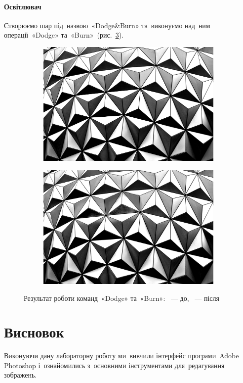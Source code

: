 \documentclass[
	a4paper,
	oneside,
	BCOR = 10mm,
	DIV = 12,
	12pt,
	headings = normal,
]{scrartcl}
\begin{document}
		\paragraph{Освітлювач}
			Створюємо шар під~назвою~\textenglish{«Dodge\&Burn»} та~виконуємо над~ним операції~\textenglish{«Dodge»} та~\textenglish{«Burn»}~(рис.~\ref{fig:07-dodge-burn}).
			\begin{figure}[!htbp]
				\centering
				\begin{subfigure}{0.5\columnwidth}
					\centering
					\includegraphics[height = 6\baselineskip]{./assets/abstract-abstract-photo-art-1070345.jpg}
					\caption{}
					\label{subfig:07-01-dodge-burn}
				\end{subfigure}%
				\begin{subfigure}{0.5\columnwidth}
					\centering
					\includegraphics[height = 6\baselineskip]{./assets/y03s01-multimedia-lab-01-p01-07-dodge-burn.jpg}
					\caption{}
					\label{subfig:07-02-dodge-burn}
				\end{subfigure}%
				\caption{Результат роботи команд~\textenglish{«Dodge»} та~\textenglish{«Burn»}: ~— до, ~— після}
				\label{fig:07-dodge-burn}
			\end{figure}

	\section{Висновок}
		Виконуючи дану лабораторну роботу ми~вивчили інтерфейс програми~\textenglish{Adobe Photoshop} і~ознайомились з~основними інструментами для~редагування зображень.
\end{document}
